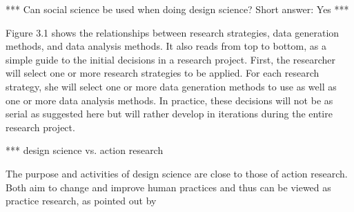 ***
Can social science be used when doing design science?
Short answer: Yes
***

Figure 3.1 shows the relationships between research strategies, data
generation methods, and data analysis methods. It also reads from
top to bottom, as a simple guide to the initial decisions in a research
project. First, the researcher will select one or more research strategies
to be applied. For each research strategy, she will select one or
more data generation methods to use as well as one or more data
analysis methods. In practice, these decisions will not be as serial as
suggested here but will rather develop in iterations during the entire
research project.




***
design science vs. action research

The purpose and activities of design science are close to
those of action research. Both aim to change and improve human practices
and thus can be viewed as practice research, as pointed out by
